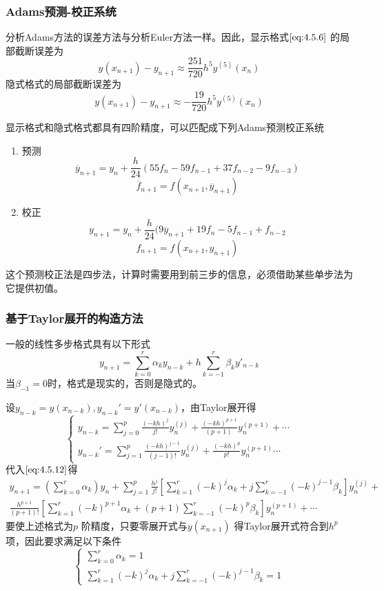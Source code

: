 \documentclass[a4paper]{article}
\begin{document}
\subsubsection{Adams预测-校正系统}
分析Adams方法的误差方法与分析Euler方法一样。因此，显示格式$\ref{eq:4.5.6}$ 的局部截断误差为
\[
y(x_{n+1}) - y_{n+1} \approx \frac{251}{720} h^{5} y^{(5)}(x_{n}) \tag{4.5.10} \label{eq:4.5.10} 
\] 
隐式格式的局部截断误差为
\[
y(x_{n+1}) - y_{n+1} \approx -\frac{19}{720} h^{5} y^{(5)}(x_{n}) \tag{4.5.11} \label{eq:4.5.11} 
\] 

显示格式和隐式格式都具有四阶精度，可以匹配成下列Adams预测校正系统
\begin{enumerate}
	\item 预测
		\[
			\overline{y}_{n+1} = y_{n} + \frac{h}{24}(55 f_n - 59 f_{n-1} + 37 f_{n-2} - 9 f_{n-3})
		\] 
		\[
			\overline{f}_{n+1} = f(x_{n+1}, \overline{y}_{n+1})
		\] 
	\item 校正
		\[
			y_{n+1} = y_{n} + \frac{h}{24} (9 \overline{y}_{n+1} + 19 f_n - 5 f_{n-1} + f_{n-2}
		\] 
		\[
			f_{n+1} = f(x_{n+1}, y_{n+1})
		\] 
\end{enumerate}
这个预测校正法是四步法，计算时需要用到前三步的信息，必须借助某些单步法为它提供初值。

\subsubsection{基于Taylor展开的构造方法}
一般的线性多步格式具有以下形式
\[
	y_{n+1} = \sum_{k=0}^{r} \alpha_k y_{n-k} + h \sum_{k=-1}^{r} \beta_k y'_{n-k} \tag{4.5.12} \label{eq:4.5.12} 
\] 
当$\beta_{-1} = 0$时，格式是现实的，否则是隐式的。

设$y_{n-k} = y(x_{n-k}), y_{n-k}' = y'(x_{n-k})$，由Taylor展开得
\[
	\begin{cases}
		y_{n-k} = \sum_{j=0}^{p} \frac{(-kh)^{j}}{j!}y_{n}^{(j)} + \frac{(-kh)^{p+1}}{(p+1)~} y_{n}^{(p+1)} + \cdots \\
		y_{n-k}' = \sum_{j=1}^{p} \frac{(-kh)^{j-1}}{(j-1)!} y_{n}^{(j)} + \frac{(-kh)^{p}}{p!} y_{n}^{(p+1)} \cdots
	\end{cases} 
\] 
代入$\ref{eq:4.5.12}$得
\[
	\tag{4.5.13} \label{eq:4.5.13} 
	\begin{aligned}
		y_{n+1} = (\sum_{k=0}^{r} \alpha_k) y_{n} + \sum_{j=1}^{p} \frac{h^{j}}{j!}[\sum_{k=1}^{r} (-k)^{j}\alpha_k + j \sum_{k=-1}^{r} (-k)^{j-1} \beta_k] y_{n}^{(j)} + \\
		\frac{h^{p+1}}{(p+1)!} [\sum_{k=1}^{r} (-k)^{p+1} \alpha_k + (p+1) \sum_{k=-1}^{r} (-k)^{p} \beta_k] y_{n}^{(p+1)} + \cdots 
	\end{aligned}
\] 
要使上述格式为$p$ 阶精度，只要零展开式与$y(x_{n+1})$ 得Taylor展开式符合到$h^{p}$ 项，因此要求满足以下条件
\[
	\tag{4.5.14} \label{eq:4.5.14} 
\begin{cases}
	\sum_{k=0}^{r} \alpha_k = 1 \\
	\sum_{k=1}^{r} (-k)^{j} \alpha_k + j \sum_{k=-1}^{r} (-k)^{j-1}\beta_k = 1
\end{cases} 
\] 
\end{document}
